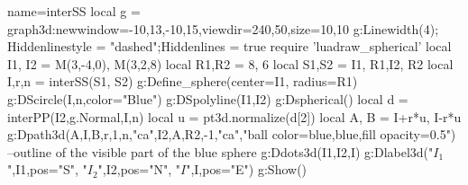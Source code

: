 \documentclass[10pt]{standalone}%
\begin{document}
\begin{luadraw}{name=interSS}
local g = graph3d:new{window={-10,13,-10,15},viewdir={240,50},size={10,10}}
 g:Linewidth(4); Hiddenlinestyle = "dashed";Hiddenlines = true
require 'luadraw_spherical'
local I1, I2 = M(3,-4,0), M(3,2,8)
local R1,R2 = 8, 6
local S1,S2 = {I1, R1},{I2, R2}
local I,r,n = interSS(S1, S2)
g:Define_sphere({center=I1, radius=R1}) 
g:DScircle({I,n},{color="Blue"})
g:DSpolyline({I1,I2})
g:Dspherical()
local d = interPP({I2,g.Normal},{I,n})
local u = pt3d.normalize(d[2])
local A, B = I+r*u, I-r*u
g:Dpath3d({A,I,B,r,1,n,"ca",I2,A,R2,-1,"ca"},"ball color=blue,blue,fill opacity=0.5") --outline of the visible part of the blue sphere
g:Ddots3d({I1,I2,I})
g:Dlabel3d("$I_1$",I1,{pos="S"}, "$I_2$",I2,{pos="N"}, "$I$",I,{pos="E"})
g:Show()
\end{luadraw} 
\end{document}
